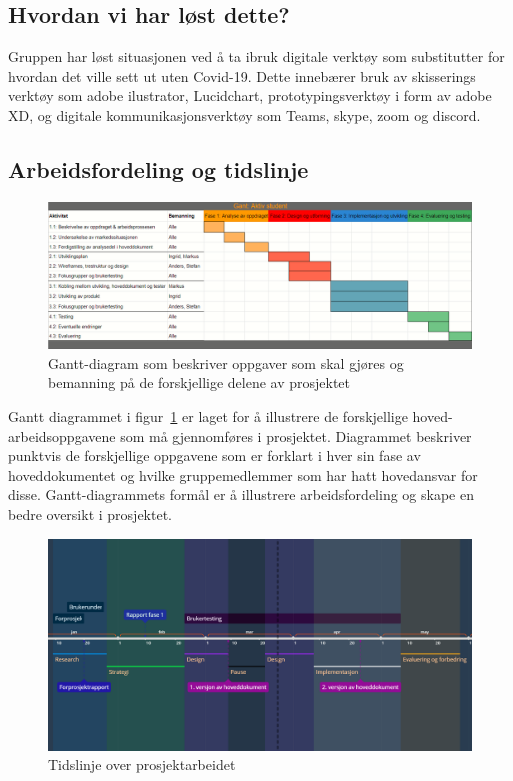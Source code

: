 \documentclass[11pt,a4paper]{report}
\begin{document}
\subsection{Hvordan vi har løst dette?}

Gruppen har løst situasjonen ved å ta ibruk digitale verktøy som substitutter for hvordan det ville sett ut uten Covid-19. Dette innebærer bruk av skisserings verktøy som adobe ilustrator, Lucidchart, prototypingsverktøy i form av adobe XD, og digitale kommunikasjonsverktøy som Teams, skype, zoom og discord. 

\subsection{Arbeidsfordeling og tidslinje}

\begin{figure}[H]
\includegraphics[width=\textwidth]{Illustrasjoner/Gantt.png}
\caption{Gantt-diagram som beskriver oppgaver som skal gjøres og bemanning på de forskjellige delene av prosjektet}
\label{fig:Gantt}
\end{figure}

Gantt diagrammet i figur~\ref{fig:Gantt} er laget for å illustrere de forskjellige hoved-arbeidsoppgavene som må gjennomføres i prosjektet. Diagrammet beskriver punktvis de forskjellige oppgavene som er forklart i hver sin fase av hoveddokumentet og hvilke gruppemedlemmer som har hatt hovedansvar for disse. Gantt-diagrammets formål er å illustrere arbeidsfordeling og skape en bedre oversikt i prosjektet.   

\begin{figure}[H]
\includegraphics[width=\textwidth]{Illustrasjoner/tidslinje-revidert-igjen.png}
\caption{Tidslinje over prosjektarbeidet}
\label{fig:tidslinje}
\end{figure}
\end{document}
